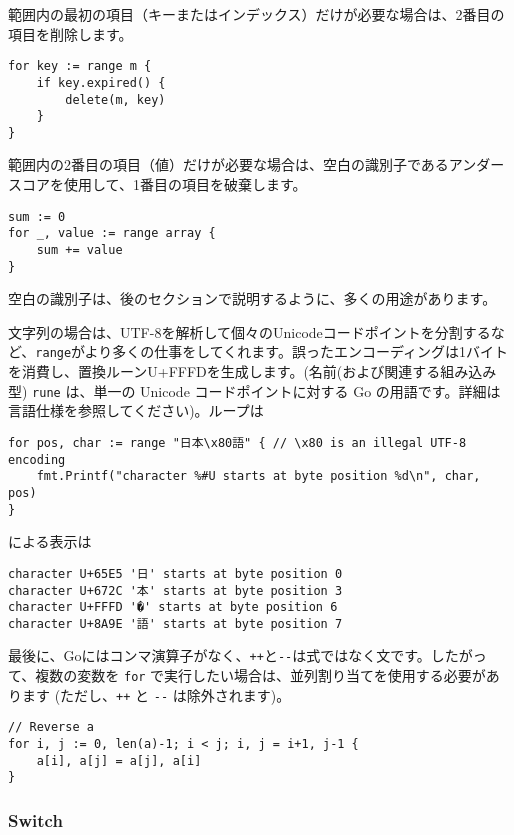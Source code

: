 \documentclass{jsarticle}
\begin{document}
範囲内の最初の項目（キーまたはインデックス）だけが必要な場合は、2番目の項目を削除します。

\begin{lstlisting}[numbers=none]
for key := range m {
    if key.expired() {
        delete(m, key)
    }
}
\end{lstlisting}

範囲内の2番目の項目（値）だけが必要な場合は、空白の識別子であるアンダースコアを使用して、1番目の項目を破棄します。

\begin{lstlisting}[numbers=none]
sum := 0
for _, value := range array {
    sum += value
}
\end{lstlisting}

空白の識別子は、{後のセクション}で説明するように、多くの用途があります。

文字列の場合は、UTF-8を解析して個々のUnicodeコードポイントを分割するなど、\texttt{range}がより多くの仕事をしてくれます。誤ったエンコーディングは1バイトを消費し、置換ルーンU+FFFDを生成します。(名前(および関連する組み込み型)
\texttt{rune} は、単一の Unicode コードポイントに対する Go
の用語です。詳細は{言語仕様}を参照してください)。ループは

\begin{lstlisting}[numbers=none]
for pos, char := range "日本\x80語" { // \x80 is an illegal UTF-8 encoding
    fmt.Printf("character %#U starts at byte position %d\n", char, pos)
}
\end{lstlisting}

による表示は

\begin{lstlisting}[numbers=none]
character U+65E5 '日' starts at byte position 0
character U+672C '本' starts at byte position 3
character U+FFFD '�' starts at byte position 6
character U+8A9E '語' starts at byte position 7
\end{lstlisting}

最後に、Goにはコンマ演算子がなく、\texttt{++}と\texttt{-\/-}は式ではなく文です。したがって、複数の変数を
\texttt{for} で実行したい場合は、並列割り当てを使用する必要があります
(ただし、\texttt{++} と \texttt{-\/-} は除外されます)。

\begin{lstlisting}[numbers=none]
// Reverse a
for i, j := 0, len(a)-1; i < j; i, j = i+1, j-1 {
    a[i], a[j] = a[j], a[i]
}
\end{lstlisting}

\subsubsection{Switch}
\end{document}
